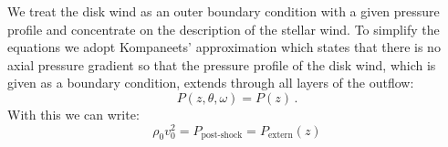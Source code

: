 We treat the disk wind as an outer boundary condition with a given pressure profile and concentrate on the description of the stellar wind. To simplify the equations we adopt Kompaneets' approximation \citep{1960SPhD....5...46K} which states that there is no axial pressure gradient so that the pressure profile of the disk wind, which is given as a boundary condition, extends through all layers of the outflow:
\begin{equation}
P(z,\theta, \omega) = P(z)\,.
\end{equation}
With this we can write:
\begin{equation}
\rho_0 v_0^2 = P_{\textrm{post-shock}} = P_{\textrm{extern}}(z)
\end{equation}
